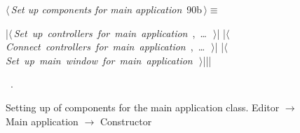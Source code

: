 \documentclass[%
    a4paper,    %
    justified,  %
    nobib,      %
    openany     %
]{tufte-book}
\makeatletter
\renewcommand{\label}[1]{\@tufte@label{##1}}%
\makeatother
\begin{document}
\begin{figure}[!htpb]
\begin{flushleft} \small
\begin{minipage}{\linewidth}\label{scrap18}\raggedright\small
{} $\langle\,${\itshape Set up components for main application}\nobreak\ {\footnotesize {90b}}$\,\rangle\equiv$
\vspace{-1ex}
\begin{pythoncode}
|\hbox{$\langle\,${\itshape Set up controllers for main application}\nobreak\ {\footnotesize {}, \ldots\ }$\,\rangle$}|
|\hbox{$\langle\,${\itshape Connect controllers for main application}\nobreak\ {\footnotesize {}, \ldots\ }$\,\rangle$}|
|\hbox{$\langle\,${\itshape Set up main window for main application}\nobreak\ {\footnotesize {}}$\,\rangle$}||\NWsep|
\end{pythoncode}
\vspace{1.5ex}
\footnotesize
\begin{list}{}{\setlength{\itemsep}{-\parsep}\setlength{\itemindent}{-\leftmargin}}
\item \NWtxtMacroRefIn\ .

\item{}
\end{list}
\end{minipage}\vspace{4ex}
\end{flushleft}
\caption{Setting up of components for the main application class.
  \newline{}\newline{}Editor $\rightarrow$ Main application $\rightarrow$
  Constructor}
\end{figure}
\end{document}
